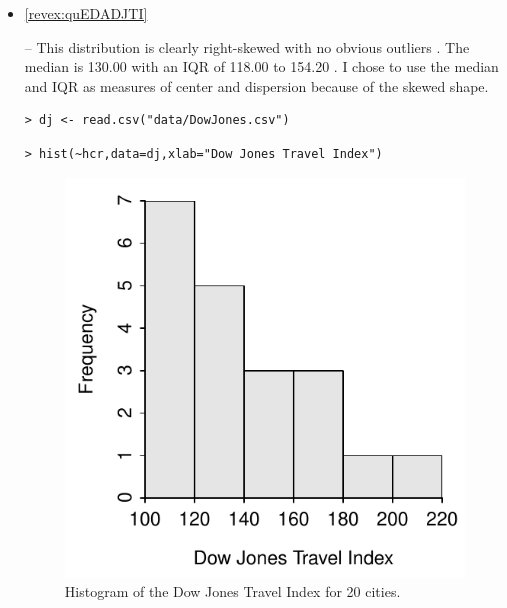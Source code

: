 \documentclass[10pt,openany]{book}\usepackage[]{graphicx}\usepackage[]{color}
\makeatletter
\newenvironment{kframe}{%
 \def\at@end@of@kframe{}%
 \ifinner\ifhmode%
  \def\at@end@of@kframe{\end{minipage}}%
  \begin{minipage}{\columnwidth}%
 \fi\fi%
 \def\FrameCommand##1{\hskip\@totalleftmargin \hskip-\fboxsep
 \colorbox{shadecolor}{##1}\hskip-\fboxsep
     \hskip-\linewidth \hskip-\@totalleftmargin \hskip\columnwidth}%
 \MakeFramed {\advance\hsize-\width
   \@totalleftmargin\z@ \linewidth\hsize
   \@setminipage}}%
 {\par\unskip\endMakeFramed%
 \at@end@of@kframe}
\newenvironment{knitrout}{}{} %
\makeatother
\begin{document}
\begin{itemize}
  \item \hypertarget{ans:quEDADJTI}{\ref{revex:quEDADJTI}} -- This distribution is clearly right-skewed with no obvious outliers .  The median is 130.00 with an IQR of 118.00 to 154.20 .  I chose to use the median and IQR as measures of center and dispersion because of the skewed shape.
\begin{knitrout}
\color{fgcolor}\begin{kframe}
\begin{verbatim}
> dj <- read.csv("data/DowJones.csv")
\end{verbatim}
\end{kframe}
\end{knitrout}
\begin{knitrout}
\color{fgcolor}\begin{kframe}
\begin{verbatim}
> hist(~hcr,data=dj,xlab="Dow Jones Travel Index")
\end{verbatim}
\end{kframe}\begin{figure}[hbtp]

{\centering \includegraphics[width=.4\linewidth]{Figs/DJHist-1} 

}

\caption[Histogram of the Dow Jones Travel Index for 20 cities]{Histogram of the Dow Jones Travel Index for 20 cities.}\label{fig:DJHist}
\end{figure}



\end{knitrout}
\end{itemize}
\end{document}

